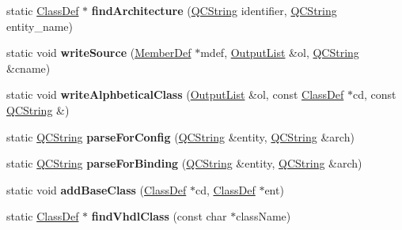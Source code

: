 \begin{DoxyCompactItemize}
\item 
\hypertarget{class_vhdl_doc_gen_af992c3ad599c82a7b4fa4fd2f49c72bf}{static \hyperlink{class_class_def}{Class\-Def} $\ast$ {\bfseries find\-Architecture} (\hyperlink{class_q_c_string}{Q\-C\-String} identifier, \hyperlink{class_q_c_string}{Q\-C\-String} entity\-\_\-name)}\label{class_vhdl_doc_gen_af992c3ad599c82a7b4fa4fd2f49c72bf}

\item 
\hypertarget{class_vhdl_doc_gen_a5dcfc6dbb2ea090f1a431d0512bad51a}{static void {\bfseries write\-Source} (\hyperlink{class_member_def}{Member\-Def} $\ast$mdef, \hyperlink{class_output_list}{Output\-List} \&ol, \hyperlink{class_q_c_string}{Q\-C\-String} \&cname)}\label{class_vhdl_doc_gen_a5dcfc6dbb2ea090f1a431d0512bad51a}

\item 
\hypertarget{class_vhdl_doc_gen_adc59a5c9c28df1f76aeb9ffdacce0f73}{static void {\bfseries write\-Alphbetical\-Class} (\hyperlink{class_output_list}{Output\-List} \&ol, const \hyperlink{class_class_def}{Class\-Def} $\ast$cd, const \hyperlink{class_q_c_string}{Q\-C\-String} \&)}\label{class_vhdl_doc_gen_adc59a5c9c28df1f76aeb9ffdacce0f73}

\item 
\hypertarget{class_vhdl_doc_gen_aa499f11043aa976c0ac2bf01a1fbbfa0}{static \hyperlink{class_q_c_string}{Q\-C\-String} {\bfseries parse\-For\-Config} (\hyperlink{class_q_c_string}{Q\-C\-String} \&entity, \hyperlink{class_q_c_string}{Q\-C\-String} \&arch)}\label{class_vhdl_doc_gen_aa499f11043aa976c0ac2bf01a1fbbfa0}

\item 
\hypertarget{class_vhdl_doc_gen_a264c742e8a529a6efee535681e3bcada}{static \hyperlink{class_q_c_string}{Q\-C\-String} {\bfseries parse\-For\-Binding} (\hyperlink{class_q_c_string}{Q\-C\-String} \&entity, \hyperlink{class_q_c_string}{Q\-C\-String} \&arch)}\label{class_vhdl_doc_gen_a264c742e8a529a6efee535681e3bcada}

\item 
\hypertarget{class_vhdl_doc_gen_adcffc8e731c1f8dae9ac224e39645537}{static void {\bfseries add\-Base\-Class} (\hyperlink{class_class_def}{Class\-Def} $\ast$cd, \hyperlink{class_class_def}{Class\-Def} $\ast$ent)}\label{class_vhdl_doc_gen_adcffc8e731c1f8dae9ac224e39645537}

\item 
\hypertarget{class_vhdl_doc_gen_ac740b3075d4b930fafd6e73372a3ed92}{static \hyperlink{class_class_def}{Class\-Def} $\ast$ {\bfseries find\-Vhdl\-Class} (const char $\ast$class\-Name)}\label{class_vhdl_doc_gen_ac740b3075d4b930fafd6e73372a3ed92}


\end{DoxyCompactItemize}

